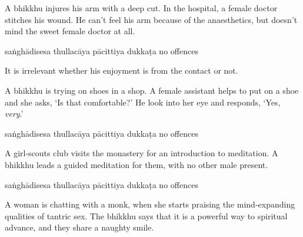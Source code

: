 \begin{exam}{\autoExamName}
\begin{problem*}
\begin{parts}
    \bigskip

  \item A bhikkhu injures his arm with a deep cut. In the hospital, a female
    doctor stitches his wound. He can't feel his arm because of the
    anaesthetics, but doesn't mind the sweet female doctor at all.

    \bigskip

    \begin{answers}{5}
      \bChoices
       saṅghādisesa\eAns
       thullacāya\eAns
       pācittiya\eAns
       dukkaṭa\eAns
       no offences\eAns
      \eChoices
    \end{answers}

    \begin{solution}
      It is irrelevant whether his enjoyment is from the contact or not.
    \end{solution}

    \bigskip

  \item A bhikkhu is trying on shoes in a shop. A female assistant helps to put
    on a shoe and she asks, `Is that comfortable?' He look into her eye and
    responds, `Yes, \textit{very}.'

    \bigskip

    \begin{answers}{5}
      \bChoices
       saṅghādisesa\eAns
       thullacāya\eAns
       pācittiya\eAns
       dukkaṭa\eAns
       no offences\eAns
      \eChoices
    \end{answers}

  \bigskip

  \item A girl-scouts club visits the monastery for an introduction to
    meditation. A bhikkhu leads a guided meditation for them, with no other male
    present.

    \bigskip

    \begin{answers}{5}
      \bChoices
       saṅghādisesa\eAns
       thullacāya\eAns
       pācittiya\eAns
       dukkaṭa\eAns
       no offences\eAns
      \eChoices
    \end{answers}

    \bigskip

  \item A woman is chatting with a monk, when she starts praising the
    mind-expanding qualities of tantric sex. The bhikkhu says that it is a
    powerful way to spiritual advance, and they share a naughty smile.


\end{parts}
\end{problem*}
\end{exam}
